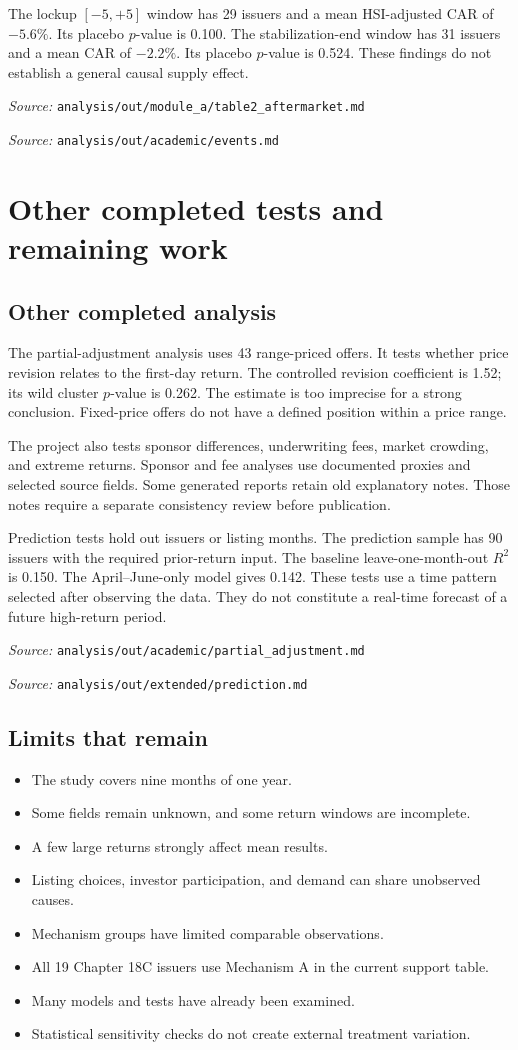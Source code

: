 \documentclass[11pt,a4paper]{article}
\newcommand{\src}[1]{\par{\footnotesize\textit{Source:} \nolinkurl{#1}}}
\begin{document}
The lockup $[-5,+5]$ window has 29 issuers and a mean HSI-adjusted CAR of $-5.6\%$.
Its placebo $p$-value is 0.100.
The stabilization-end window has 31 issuers and a mean CAR of $-2.2\%$.
Its placebo $p$-value is 0.524.
These findings do not establish a general causal supply effect.
\src{analysis/out/module_a/table2_aftermarket.md}
\src{analysis/out/academic/events.md}

\newpage
\section{Other completed tests and remaining work}
\subsection{Other completed analysis}
The partial-adjustment analysis uses 43 range-priced offers.
It tests whether price revision relates to the first-day return.
The controlled revision coefficient is 1.52; its wild cluster $p$-value is 0.262.
The estimate is too imprecise for a strong conclusion.
Fixed-price offers do not have a defined position within a price range.

The project also tests sponsor differences, underwriting fees, market crowding, and extreme returns.
Sponsor and fee analyses use documented proxies and selected source fields.
Some generated reports retain old explanatory notes.
Those notes require a separate consistency review before publication.

Prediction tests hold out issuers or listing months.
The prediction sample has 90 issuers with the required prior-return input.
The baseline leave-one-month-out $R^2$ is 0.150.
The April--June-only model gives 0.142.
These tests use a time pattern selected after observing the data.
They do not constitute a real-time forecast of a future high-return period.
\src{analysis/out/academic/partial_adjustment.md}
\src{analysis/out/extended/prediction.md}

\subsection{Limits that remain}
\begin{itemize}
\item The study covers nine months of one year.
\item Some fields remain unknown, and some return windows are incomplete.
\item A few large returns strongly affect mean results.
\item Listing choices, investor participation, and demand can share unobserved causes.
\item Mechanism groups have limited comparable observations.
\item All 19 Chapter 18C issuers use Mechanism A in the current support table.
\item Many models and tests have already been examined.
\item Statistical sensitivity checks do not create external treatment variation.
\end{itemize}
\end{document}
